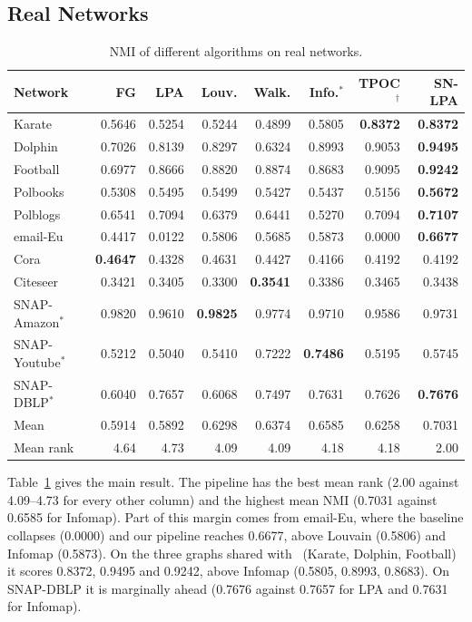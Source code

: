 \documentclass[conference]{IEEEtran}
\begin{document}
\subsection{Real Networks}
\begin{table}[!tp]
\centering
\caption{NMI of different algorithms on real networks.}
\label{tab:real}
\footnotesize
\begin{tabular*}{\textwidth}{@{\extracolsep{\fill}}lrrrrrrr}
\toprule
Network & FG & LPA & Louv. & Walk. & Info.$^{*}$ & TPOC$^{\dagger}$ & SN-LPA \\
\midrule
Karate & 0.5646 & 0.5254 & 0.5244 & 0.4899 & 0.5805 & \textbf{0.8372} & \textbf{0.8372} \\
Dolphin & 0.7026 & 0.8139 & 0.8297 & 0.6324 & 0.8993 & 0.9053 & \textbf{0.9495} \\
Football & 0.6977 & 0.8666 & 0.8820 & 0.8874 & 0.8683 & 0.9095 & \textbf{0.9242} \\
Polbooks & 0.5308 & 0.5495 & 0.5499 & 0.5427 & 0.5437 & 0.5156 & \textbf{0.5672} \\
Polblogs & 0.6541 & 0.7094 & 0.6379 & 0.6441 & 0.5270 & 0.7094 & \textbf{0.7107} \\
email-Eu & 0.4417 & 0.0122 & 0.5806 & 0.5685 & 0.5873 & 0.0000 & \textbf{0.6677} \\
Cora & \textbf{0.4647} & 0.4328 & 0.4631 & 0.4427 & 0.4166 & 0.4192 & 0.4192 \\
Citeseer & 0.3421 & 0.3405 & 0.3300 & \textbf{0.3541} & 0.3386 & 0.3465 & 0.3438 \\
SNAP-Amazon$^{*}$ & 0.9820 & 0.9610 & \textbf{0.9825} & 0.9774 & 0.9710 & 0.9586 & 0.9731 \\
SNAP-Youtube$^{*}$ & 0.5212 & 0.5040 & 0.5410 & 0.7222 & \textbf{0.7486} & 0.5195 & 0.5745 \\
SNAP-DBLP$^{*}$ & 0.6040 & 0.7657 & 0.6068 & 0.7497 & 0.7631 & 0.7626 & \textbf{0.7676} \\
\midrule
Mean & 0.5914 & 0.5892 & 0.6298 & 0.6374 & 0.6585 & 0.6258 & 0.7031 \\
Mean rank & 4.64 & 4.73 & 4.09 & 4.09 & 4.18 & 4.18 & 2.00 \\
\bottomrule
\end{tabular*}
\end{table}
Table~\ref{tab:real} gives the main result. The pipeline has the best mean rank (2.00 against 4.09--4.73 for every other column) and the highest mean NMI (0.7031 against 0.6585 for Infomap). Part of this margin comes from email-Eu, where the baseline collapses (0.0000) and our pipeline reaches 0.6677, above Louvain (0.5806) and Infomap (0.5873). On the three graphs shared with~\cite{kong2026} (Karate, Dolphin, Football) it scores 0.8372, 0.9495 and 0.9242, above Infomap (0.5805, 0.8993, 0.8683). On SNAP-DBLP it is marginally ahead (0.7676 against 0.7657 for LPA and 0.7631 for Infomap).
\end{document}
